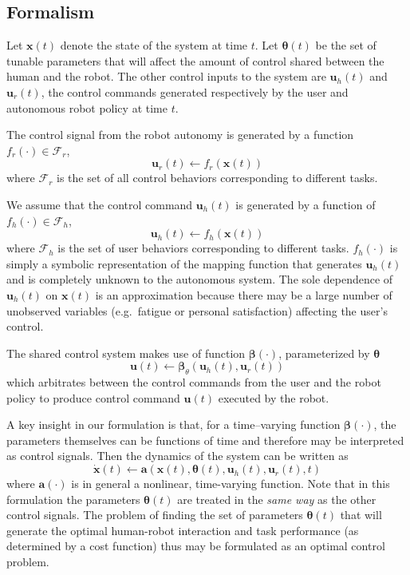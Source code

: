 \documentclass[letterpaper, 10 pt, journal, twoside]{IEEEtran}  %
\begin{document}
	\subsection{Formalism}
	Let $\boldsymbol{x}(t)$ denote the state of the system at time $t$. 
	Let $\boldsymbol{\theta}(t)$ be the set of tunable parameters that will affect the amount of control shared between the human and the robot. 
	The other control inputs to the system are $\boldsymbol{u}_h(t)$ and $\boldsymbol{u}_r(t)$, the control commands generated respectively by the user and autonomous robot policy at time $t$. 
	
	The control signal from the robot autonomy is generated by a function $f_{r}(\cdot) \in \mathcal{F}_{r}$, 
	\begin{equation}
	\boldsymbol{u}_r(t) \leftarrow f_{r}(\boldsymbol{x}(t))
	\end{equation}
	where $\mathcal{F}_{r}$ is the set of all control behaviors corresponding to different tasks.
	
	We assume that the control command $\boldsymbol{u}_h(t)$ is generated by a function of  $f_{h}(\cdot) \in \mathcal{F}_{h}$,
	\begin{equation}
	\boldsymbol{u}_h(t) \leftarrow f_{h}(\boldsymbol{x}(t))
	\end{equation}
	where $\mathcal{F}_{h}$ is the set of user behaviors corresponding to different tasks. $f_{h}(\cdot)$ is simply a symbolic representation of the mapping function that generates $\boldsymbol{u}_{h}(t)$ and is completely unknown to the autonomous system.
	The sole dependence of $\boldsymbol{u}_h(t)$ on $\boldsymbol{x}(t)$ is an approximation because there may be a large number of unobserved variables (e.g.~fatigue or personal satisfaction) affecting the user's control. 
	
	The shared control system makes use of function $\boldsymbol{\beta}(\cdot)$, parameterized by $\boldsymbol{\theta}$
	\begin{equation}
	\boldsymbol{u}(t) \leftarrow \boldsymbol{\beta}_{\theta}(\boldsymbol{u}_h(t), \boldsymbol{u}_r(t))
	\end{equation}
	which arbitrates between the control commands from the user and the robot policy to produce control command $\boldsymbol{u}(t)$ executed by the robot.
	
	A key insight in our formulation is that, for a time--varying function $\boldsymbol{\beta}(\cdot)$, the parameters themselves can be functions of time and therefore may be interpreted as control signals. Then the dynamics of the system can be written as
	\begin{equation}
	\boldsymbol{\dot{x}}(t) \leftarrow \boldsymbol{a}(\boldsymbol{x}(t), \boldsymbol{\theta}(t), \boldsymbol{u}_h(t), \boldsymbol{u}_r(t), t)
	\end{equation}
	where $\boldsymbol{a}(\cdot)$ is in general a nonlinear, time-varying function. Note that in this formulation the parameters $\boldsymbol{\theta}(t)$ are treated in the \textit{same way} as the other control signals.
	The problem of finding the set of parameters $\boldsymbol{\theta}(t)$ that will generate the optimal human-robot interaction and task performance (as determined by a cost function) thus may be formulated as an optimal control problem.
	
\end{document}
